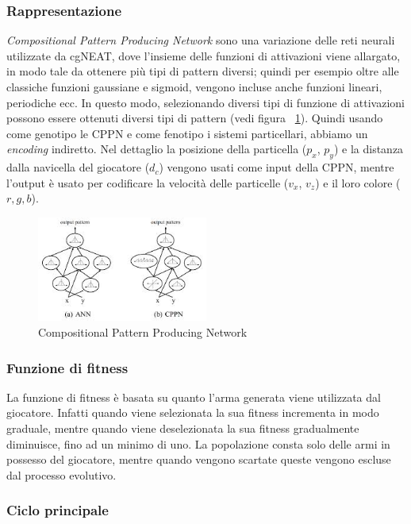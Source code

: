 \documentclass[12pt, italian]{toptesi}
\begin{document}
\subsubsection{Rappresentazione} 

\emph{Compositional Pattern Producing Network} sono una variazione delle reti neurali utilizzate da cgNEAT, dove l'insieme delle funzioni di attivazioni viene allargato, in modo tale da ottenere più tipi di pattern diversi; quindi per esempio oltre alle classiche funzioni gaussiane e sigmoid, vengono incluse anche funzioni lineari, periodiche ecc.
In questo modo, selezionando diversi tipi di funzione di attivazioni possono essere ottenuti diversi tipi di pattern (vedi figura ~\ref{fig:CPPN}).
Quindi usando come genotipo le CPPN e come fenotipo i sistemi particellari, abbiamo un \emph{encoding} indiretto.
Nel dettaglio la posizione della particella ($p_{x}$, $ p_{y}$) e la distanza dalla navicella del giocatore ($d_{c}$) vengono usati come input della CPPN, mentre l'output è usato per codificare la velocità delle particelle ($v_{x}$, $v_{z}$) e il loro colore ($r, g, b$).

\begin{figure} 
\centering
\includegraphics[width=0.5\textwidth]{CPPN}
\caption{Compositional Pattern Producing Network}
\label{fig:CPPN}
\end{figure}

\subsubsection{Funzione di fitness} 
La funzione di fitness è basata su quanto l'arma generata viene utilizzata dal giocatore.
Infatti quando viene selezionata la sua fitness incrementa in modo graduale, mentre quando viene deselezionata la sua fitness
gradualmente diminuisce, fino ad un minimo di uno.
La popolazione consta solo delle armi in possesso del giocatore, mentre quando vengono scartate queste vengono escluse dal
processo evolutivo.

\subsubsection{Ciclo principale}
\end{document}
